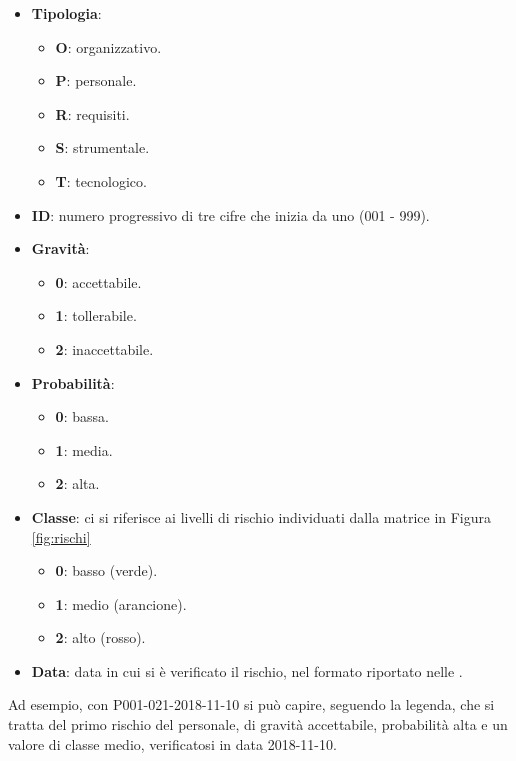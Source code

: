 	\begin{itemize}
		\item \textbf{Tipologia}:
			\begin{itemize}
				\item \textbf{O}: organizzativo.
				\item \textbf{P}: personale.
				\item \textbf{R}: requisiti.
				\item \textbf{S}: strumentale.
				\item \textbf{T}: tecnologico.
			\end{itemize}

		\item \textbf{ID}: numero progressivo di tre cifre che inizia da uno (001 - 999).
		\item \textbf{Gravità}:
			\begin{itemize}
				\item \textbf{0}: accettabile.
				\item \textbf{1}: tollerabile.
				\item \textbf{2}: inaccettabile.
			\end{itemize}

		\item \textbf{Probabilità}:
			\begin{itemize}
				\item \textbf{0}: bassa.
				\item \textbf{1}: media.
				\item \textbf{2}: alta.
			\end{itemize}

		\item \textbf{Classe}: ci si riferisce ai livelli di rischio individuati dalla matrice in Figura \ref{fig:rischi}
			\begin{itemize}
				\item \textbf{0}: basso (verde).
				\item \textbf{1}: medio (arancione).
				\item \textbf{2}: alto (rosso).
			\end{itemize}
			
		\item \textbf{Data}: data in cui si è verificato il rischio, nel formato riportato nelle \NdP.
	\end{itemize}

	Ad esempio, con P001-021-2018-11-10 si può capire, seguendo la legenda, che si tratta del primo rischio del personale, di gravità accettabile, probabilità alta e un valore di classe medio, verificatosi in data 2018-11-10.

